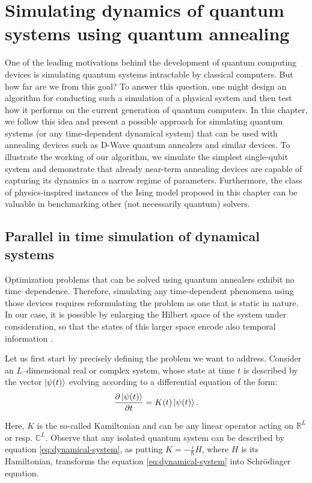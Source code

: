 \chapter{Simulating dynamics of quantum systems using quantum annealing}
\label{chapter:simulating}

One of the leading motivations behind the development of quantum computing
devices is simulating quantum systems intractable by classical computers. But
how far are we from this goal? To answer this question, one might design an
algorithm for conducting such a simulation of a physical system and then test
how it performs on the current generation of quantum computers. In this
chapter, we follow this idea and present a possible approach for simulating
quantum systems (or any time-dependent dynamical system) that can be used with
annealing devices such as D-Wave quantum annealers and similar devices. To
illustrate the working of our algorithm, we simulate the simplest single-qubit
system and demonstrate that already near-term annealing devices are capable of
capturing its dynamics in a narrow regime of parameters. Furthermore, the class
of physics-inspired instances of the Ising model proposed in this chapter
can be valuable in benchmarking other (not necessarily quantum) solvers.

\section{Parallel in time simulation of dynamical systems}
Optimization problems that can be solved using quantum annealers exhibit no
time--dependence. Therefore, simulating any time-dependent phenomena using
those devices requires reformulating the problem as one that is static in
nature. In our case, it is possible by enlarging the Hilbert space of the
system under consideration, so that the states of this larger space encode also
temporal information \cite{feynmanclock}.

Let us first start by precisely defining the problem we want to address.
Consider an $L$--dimensional real or complex system, whose state at time $t$ is
described by the vector $\ket{\psi(t)}$ evolving according to a differential
equation of the form:
\begin{equation}
  \label{eq:dynamical-system}
  \frac{\partial \ket{\psi(t)}}{\partial t} = K(t) \ket{\psi(t)}.
\end{equation}

Here, $K$ is the so-called Kamiltonian \cite{goldstein2002classical} and can be
any linear operator acting on $\mathbb{R}^L$ or resp. $\mathbb{C}^L$. Observe
that any isolated quantum system can be described by equation
\eqref{eq:dynamical-system}, as putting $K=-\frac{i}{\hbar}H$, where $H$ is its
Hamiltonian, transforms the equation \eqref{eq:dynamical-system} into
Schr\"{o}dinger equation.

